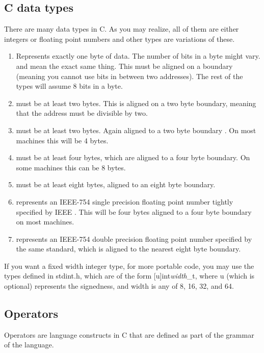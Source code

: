 \subsection{C data types}

There are many data types in C. As you may realize, all of them are either integers or floating point numbers and other types are variations of these.

\begin{enumerate}
	\item {} Represents exactly one byte of data. The number of bits in a byte might vary.  and  mean the exact same thing. This must be aligned on a boundary (meaning you cannot use bits in between two addresses). The rest of the types will assume 8 bits in a byte.
	\item {} must be at least two bytes. This is aligned on a two byte boundary, meaning that the address must be divisible by two.
	\item {} must be at least two bytes. Again aligned to a two byte boundary \cite[P. 34]{ISON1124}. On most machines this will be 4 bytes.
	\item {} must be at least four bytes, which are aligned to a four byte boundary. On some machines this can be 8 bytes.
	\item {} must be at least eight bytes, aligned to an eight byte boundary.
	\item {} represents an IEEE-754 single precision floating point number tightly specified by IEEE \cite{4610935}. This will be four bytes aligned to a four byte boundary on most machines.
	\item {} represents an IEEE-754 double precision floating point number specified by the same standard, which is aligned to the nearest eight byte boundary.
\end{enumerate}

If you want a fixed width integer type, for more portable code, you may use the types defined in stdint.h, which are of the form [u]int\emph{width}_t, where u (which is optional) represents the signedness, and width is any of 8, 16, 32, and 64.

\subsection{Operators}

Operators are language constructs in C that are defined as part of the grammar of the language.

